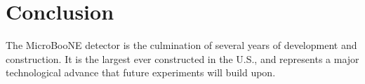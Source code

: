 \section{Conclusion}
\label{sec:conclusion}

The MicroBooNE detector is the culmination of several years of development and construction.  It is the largest \lartpc ever constructed in the U.S., and represents a major technological advance that future experiments will build upon.  